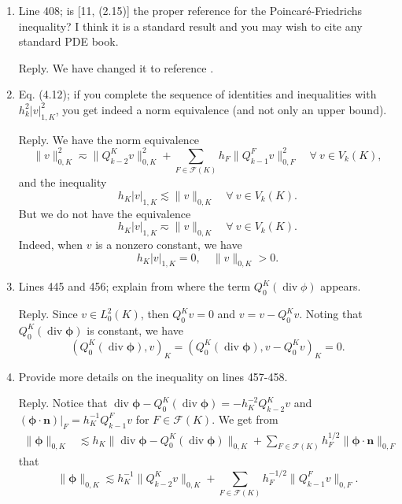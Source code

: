 \documentclass[10pt]{amsart}
\theoremstyle{definition}
\theoremstyle{remark}
\renewcommand{\div}{\operatorname{div}}
\begin{document}
\begin{enumerate}[1.]
\item \textsf{Line 408; is [11, (2.15)] the proper reference for the Poincar\'e-Friedrichs inequality? I think it is a standard result and you may wish to cite any standard PDE book.}

\smallskip \noindent \textcolor[rgb]{1.00,0.00,0.00}{Reply.}
We have changed it to reference \cite{Necas1967}.

\medskip

\item \textsf{Eq. (4.12); if you complete the sequence of identities and inequalities with $h_k^2|v|_{1,K}^2$, you get indeed a norm equivalence (and not only an upper bound).}

\smallskip \noindent \textcolor[rgb]{1.00,0.00,0.00}{Reply.}
We have the norm equivalence
\[
\|v\|_{0,K}^2\eqsim \|Q_{k-2}^Kv\|_{0,K}^2+\sum_{F\in\mathcal F(K)}h_F\|Q_{k-1}^Fv\|_{0,F}^2 \quad\forall~v\in V_k(K),
\]
and the inequality
\[
h_K|v|_{1,K}\lesssim \|v\|_{0,K}\quad\forall~v\in V_k(K).
\]
But we do not have 
the equivalence
\[
h_K|v|_{1,K}\eqsim \|v\|_{0,K}\quad\forall~v\in V_k(K).
\]
Indeed, when $v$ is a nonzero constant, we have
$$
h_K|v|_{1,K}=0,\quad \|v\|_{0,K}>0.
$$ 

\medskip

\item \textsf{Lines 445 and 456; explain from where the term $Q_0^K(\div\phi)$ appears.}

\smallskip \noindent \textcolor[rgb]{1.00,0.00,0.00}{Reply.}
Since $v\in L_0^2(K)$, then $Q_{0}^Kv=0$ and $v=v-Q_{0}^Kv$. Noting that $Q_{0}^K(\div\boldsymbol{\phi})$ is constant, we have
$$
(Q_{0}^K(\div\boldsymbol{\phi}), v)_K=(Q_{0}^K(\div\boldsymbol{\phi}), v-Q_{0}^Kv)_K=0.
$$

\medskip

\item \textsf{Provide more details on the inequality on lines 457-458.}

\smallskip \noindent \textcolor[rgb]{1.00,0.00,0.00}{Reply.}
Notice that $\div\boldsymbol{\phi}-Q_{0}^K(\div\boldsymbol{\phi})=-h_K^{-2}Q_{k-2}^Kv$ and $(\boldsymbol{\phi}\cdot\boldsymbol{n})|_{F}=h_K^{-1}Q_{k-1}^Fv$ for $F\in\mathcal F(K)$.
We get from 
\begin{align*}
\|\boldsymbol{\phi}\|_{0,K}%
&\lesssim h_K\|\div\boldsymbol{\phi}-Q_0^K(\div\boldsymbol{\phi})\|_{0,K} +\sum_{F\in\mathcal F(K)}h_F^{1/2}\|\boldsymbol{\phi}\cdot\boldsymbol{n}\|_{0,F}
\end{align*}
that
\[
\|\boldsymbol{\phi}\|_{0,K}\lesssim h_K^{-1}\|Q_{k-2}^Kv\|_{0,K} +\sum_{F\in\mathcal F(K)}h_F^{-1/2}\|Q_{k-1}^Fv\|_{0,F}.
\]



\end{enumerate}
\end{document}
